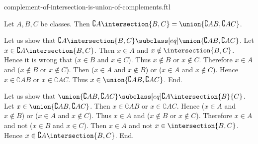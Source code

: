 \documentclass{article}
\begin{document}
\begin{smodule}[creators={Marcel Schütz}]{complement-of-intersection-is-union-of-complements.ftl}

  \begin{fproposition*}[label=2864251928576000]
    Let $A, B, C$ be classes.
    Then $\complement{A}{\intersection{B,C}} = \union{\complement{A}{B},\complement{A}{C}}$.
  \end{fproposition*}
  \begin{fproof}
    Let us show that $\complement{A}{\intersection{B,C}} \subclass[eq]
    \union{\complement{A}{B},\complement{A}{C}}$.
      Let $x \in \complement{A}{\intersection{B,C}}$.
      Then $x \in A$ and $x \notin \intersection{B,C}$.
      Hence it is wrong that ($x \in B$ and $x \in C$).
      Thus $x \notin B$ or $x \notin C$.
      Therefore $x \in A$ and ($x \notin B$ or $x \notin C$).
      Then ($x \in A$ and $x \notin B$) or ($x \in A$ and $x \notin C$).
      Hence $x \in \complement{A}{B}$ or $x \in \complement{A}{C}$.
      Thus $x \in \union{\complement{A}{B},\complement{A}{C}}$.
    End.

    Let us show that $\union{\complement{A}{B},\complement{A}{C}} \subclass[eq]
    \complement{A}{\intersection{B}{C}}$.
      Let $x \in \union{\complement{A}{B},\complement{A}{C}}$.
      Then $x \in \complement{A}{B}$ or $x \in \complement{A}{C}$.
      Hence ($x \in A$ and $x \notin B$) or ($x \in A$ and $x \notin C$).
      Thus $x \in A$ and ($x \notin B$ or $x \notin C$).
      Therefore $x \in A$ and not ($x \in B$ and $x \in C$).
      Then $x \in A$ and not $x \in \intersection{B,C}$.
      Hence $x \in \complement{A}{\intersection{B,C}}$.
    End.
  \end{fproof}
\end{smodule}
\end{document}
